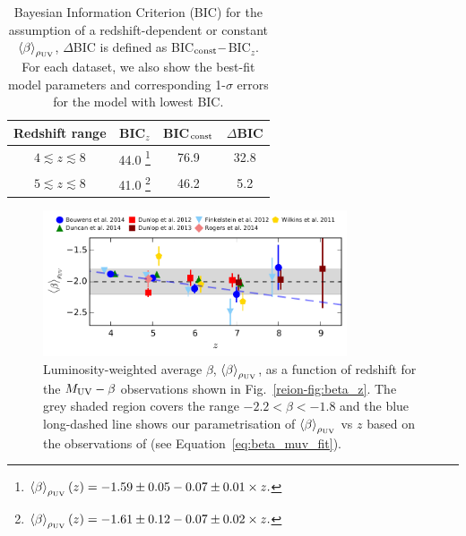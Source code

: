 \begin{table}
\begin{minipage}{0.9\textwidth}
\centering
  \caption[Bayesian Information Criterion (BIC) for the assumption of a redshift-dependent or constant $\left \langle \beta  \right \rangle_{\rho_{\rm{UV}}}$.]{Bayesian Information Criterion (BIC) for the assumption of a redshift-dependent or constant $\left \langle \beta  \right \rangle_{\rho_{\rm{UV}}}$, $\Delta$BIC is defined as BIC$_{\rm{const}} -$BIC$_{z}$. For each dataset, we also show the best-fit model parameters and corresponding 1-$\sigma$ errors for the model with lowest BIC.}	
	\begin{tabular}{cccc}\label{tab:BIC_betaz}
    	Redshift range	& BIC$_{z}$ & BIC$_{\rm{const}}$ & $\Delta$BIC \\
    \hline
	$4 \lesssim z \lesssim 8$  & 44.0   \footnote[1]{\(\left \langle \beta \right \rangle_{\rho_{\rm{UV}}}(z) = -1.59 \pm 0.05 - 0.07 \pm 0.01\times z.\)} & 76.9  & 32.8 \\
	$5 \lesssim z \lesssim 8$ & 41.0   \footnote[2]{\(\left \langle \beta \right \rangle_{\rho_{\rm{UV}}}(z) = -1.61 \pm 0.12 - 0.07 \pm 0.02\times z.\)} & 46.2 & 5.2 \\
  \end{tabular}
  \end{minipage}
\end{table}

\begin{figure}
\centering
  \includegraphics[width=0.8\textwidth]{plots/Fig3.pdf}
  \caption[Luminosity-weighted average $\beta$, $\left \langle \beta  \right \rangle_{\rho_{\rm{UV}}}$, as a function of redshift for the $M_{\rm{UV}}-\beta$ observations shown in Fig.~\ref{reion-fig:beta_z}.]{Luminosity-weighted average $\beta$, $\left \langle \beta  \right \rangle_{\rho_{\rm{UV}}}$, as a function of redshift for the $M_{\rm{UV}}-\beta$ observations shown in Fig.~\ref{reion-fig:beta_z}. The grey shaded region covers the range $-2.2 < \beta < -1.8$ and the blue long-dashed line shows our parametrisation of $\left \langle \beta \right \rangle_{\rho_{\rm{UV}}}$ vs $z$ based on the observations of \citet{Bouwens:2013vf} (see Equation~\ref{eq:beta_muv_fit}).}
  \label{reion-fig:beta_weightedavg}
\end{figure}

